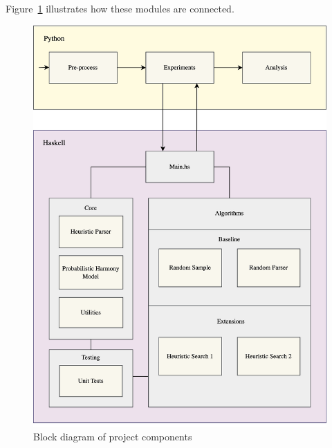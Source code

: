 \documentclass[12pt,a4paper,twoside,openright]{report} \usepackage[pdfborder={0 0 0}]{hyperref}    %
\theoremstyle{definition} \newtheorem{definition}{Definition}[section]
\begin{document}
Figure~\ref{fig:blockDiagram} illustrates how these modules are connected. 

\begin{figure}[h] \centering \includegraphics[width=\textwidth]{blockDiagram.png} \caption{Block diagram of project
components} \label{fig:blockDiagram} \end{figure}
\end{document}
